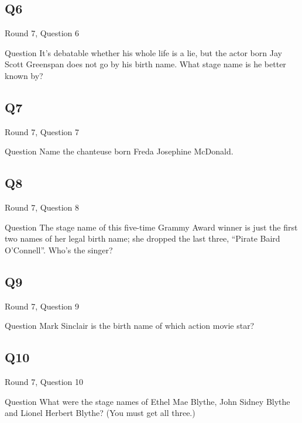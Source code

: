 \documentclass[11pt]{beamer}
\begin{document}
\subsection*{Q6}
\begin{frame}[t]{Round 7, Question 6}
\begin{block}{Question}
It's debatable whether his whole life is a lie, but the actor born Jay Scott Greenspan does not go by his birth name. What stage name is he better known by?
\end{block}
\end{frame}
\subsection*{Q7}
\begin{frame}[t]{Round 7, Question 7}
\begin{block}{Question}
Name the chanteuse born Freda Josephine McDonald.
\end{block}
\end{frame}
\subsection*{Q8}
\begin{frame}[t]{Round 7, Question 8}
\begin{block}{Question}
The stage name of this five-time Grammy Award winner is just the first two names of her legal birth name; she dropped the last three, ``Pirate Baird O'Connell''. Who's the singer?
\end{block}
\end{frame}
\subsection*{Q9}
\begin{frame}[t]{Round 7, Question 9}
\begin{block}{Question}
Mark Sinclair is the birth name of which action movie star?
\end{block}
\end{frame}
\subsection*{Q10}
\begin{frame}[t]{Round 7, Question 10}
\begin{block}{Question}
What were the stage names of Ethel Mae Blythe, John Sidney Blythe and Lionel Herbert Blythe? (You must get all three.)
\end{block}
\end{frame}
\end{document}
